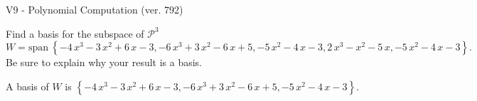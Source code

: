 \begin{exercise}
  \begin{exerciseTitle}V9 - Polynomial Computation (ver. 792)\end{exerciseTitle}
  \begin{exerciseStatement}
    Find a basis for the subspace of \(\mathcal{P}^3\) 
\[W=\mathrm{span}\ \left\{-4 \, x^{3} - 3 \, x^{2} + 6 \, x - 3 , -6 \, x^{3} + 3 \, x^{2} - 6 \, x + 5 , -5 \, x^{2} - 4 \, x - 3 , 2 \, x^{3} - x^{2} - 5 \, x , -5 \, x^{2} - 4 \, x - 3\right\}.\]
 Be sure to explain why your result is a basis.


  \end{exerciseStatement}
  \begin{exerciseAnswer}
   A basis of \(W\) is  \(\left\{-4 \, x^{3} - 3 \, x^{2} + 6 \, x - 3 , -6 \, x^{3} + 3 \, x^{2} - 6 \, x + 5 , -5 \, x^{2} - 4 \, x - 3\right\}\).
  


  \end{exerciseAnswer}
\end{exercise}